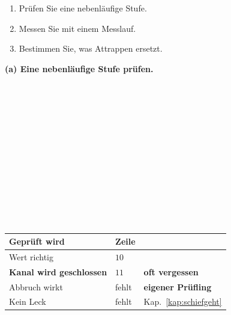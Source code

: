 \begin{aufgabe}
\begin{enumerate}[label=(\alph*)]
\item Prüfen Sie eine nebenläufige Stufe.
\item Messen Sie mit einem Messlauf.
\item Bestimmen Sie, was Attrappen ersetzt.
\end{enumerate}

\loesung
\textbf{(a) Eine nebenläufige Stufe prüfen.}

\begin{center}
\begin{minipage}{0.92\textwidth}
\\
\\
\\
\\
\\
\\
\\
\\
\\
\\
\\
\\
\code{\}}
\end{minipage}
\end{center}

\begin{center}
\renewcommand{\arraystretch}{1.45}
\begin{tabular}{@{}P{3.0cm}P{2.2cm}P{2.8cm}@{}}
\toprule
\textbf{Geprüft wird} & \textbf{Zeile} & \\
\midrule
Wert richtig & $10$ & \\
\textbf{Kanal wird geschlossen} & $11$ & \textcolor{gruen}{\textbf{oft vergessen}}\\
Abbruch wirkt & \textcolor{akzent}{fehlt} & \textbf{eigener Prüfling}\\
Kein Leck & \textcolor{akzent}{fehlt} & \textcolor{gruen}{Kap.~\ref{kap:schiefgeht}}\\
\bottomrule
\end{tabular}
\end{center}


\end{aufgabe}
